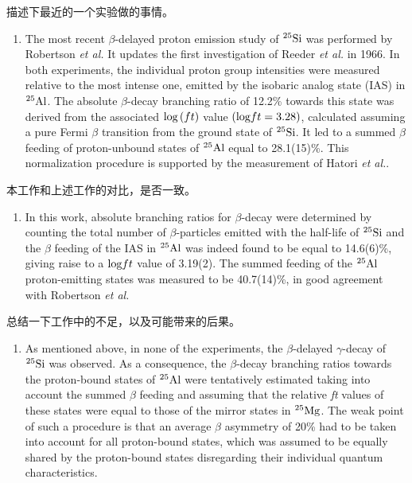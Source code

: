 \documentclass[a4paper]{article}
\begin{document}
描述下最近的一个实验做的事情。

\begin{enumerate}
    \item The most recent $\beta$-delayed proton emission study of $^{25}\textnormal{Si}$ was performed by Robertson \textit{et al.} It updates the first investigation of Reeder \textit{et al.} in 1966. In both experiments, the individual proton group intensities were measured relative to the most intense one, emitted by the isobaric analog state (IAS) in $^{25}\textnormal{Al}$. The absolute $\beta$-decay branching ratio of 12.2\% towards this state was derived from the associated $\textnormal{log}\left( ft \right)$ value $\left( \textnormal{log}ft=3.28 \right)$, calculated assuming a pure Fermi $\beta$ transition from the ground state of $^{25}\textnormal{Si}$. It led to a summed $\beta$ feeding of proton-unbound states of $^{25}\textnormal{Al}$ equal to 28.1(15)\%. This normalization procedure is supported by the measurement of Hatori \textit{et al.}. 
\end{enumerate}

本工作和上述工作的对比，是否一致。

\begin{enumerate}
    \item In this work, absolute branching ratios for $\beta$-decay were determined by counting the total number of $\beta$-particles emitted with the half-life of $^{25}\textnormal{Si}$ and the $\beta$ feeding of the IAS in $^{25}\textnormal{Al}$ was indeed found to be equal to 14.6(6)\%, giving raise to a $\textnormal{log}ft$ value of 3.19(2). The summed feeding of the $^{25}\textnormal{Al}$ proton-emitting states was measured to be 40.7(14)\%, in good agreement with Robertson \textit{et al.}
\end{enumerate}

总结一下工作中的不足，以及可能带来的后果。
\begin{enumerate}
    \item As mentioned above, in none of the experiments, the $\beta$-delayed $\gamma$-decay of $^{25}\textnormal{Si}$ was observed. As a consequence, the $\beta$-decay branching ratios towards the proton-bound states of $^{25}\textnormal{Al}$ were tentatively estimated taking into account the summed $\beta$ feeding and assuming that the relative \textit{ft} values of these states were equal to those of the mirror states in $^{25}\textnormal{Mg}$. The weak point of such a procedure is that an average $\beta$ asymmetry of 20\% had to be taken into account for all proton-bound states, which was assumed to be equally shared by the proton-bound states disregarding their individual quantum characteristics.
\end{enumerate}
\end{document}
